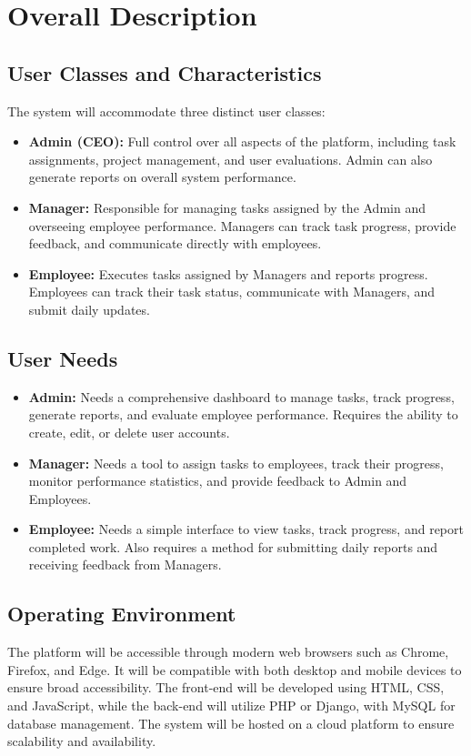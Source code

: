 \documentclass[a4paper,12pt]{article}
\begin{document}
\newpage

\section{Overall Description}

\subsection{User Classes and Characteristics}
The system will accommodate three distinct user classes:
\begin{itemize}
    \item \textbf{Admin (CEO):} Full control over all aspects of the platform, including task assignments, project management, and user evaluations. Admin can also generate reports on overall system performance.
    \item \textbf{Manager:} Responsible for managing tasks assigned by the Admin and overseeing employee performance. Managers can track task progress, provide feedback, and communicate directly with employees.
    \item \textbf{Employee:} Executes tasks assigned by Managers and reports progress. Employees can track their task status, communicate with Managers, and submit daily updates.
\end{itemize}

\subsection{User Needs}
\begin{itemize}
    \item \textbf{Admin:} Needs a comprehensive dashboard to manage tasks, track progress, generate reports, and evaluate employee performance. Requires the ability to create, edit, or delete user accounts.
    \item \textbf{Manager:} Needs a tool to assign tasks to employees, track their progress, monitor performance statistics, and provide feedback to Admin and Employees.
    \item \textbf{Employee:} Needs a simple interface to view tasks, track progress, and report completed work. Also requires a method for submitting daily reports and receiving feedback from Managers.
\end{itemize}

\subsection{Operating Environment}
The platform will be accessible through modern web browsers such as Chrome, Firefox, and Edge. It will be compatible with both desktop and mobile devices to ensure broad accessibility. The front-end will be developed using HTML, CSS, and JavaScript, while the back-end will utilize PHP or Django, with MySQL for database management. The system will be hosted on a cloud platform to ensure scalability and availability.
\end{document}
